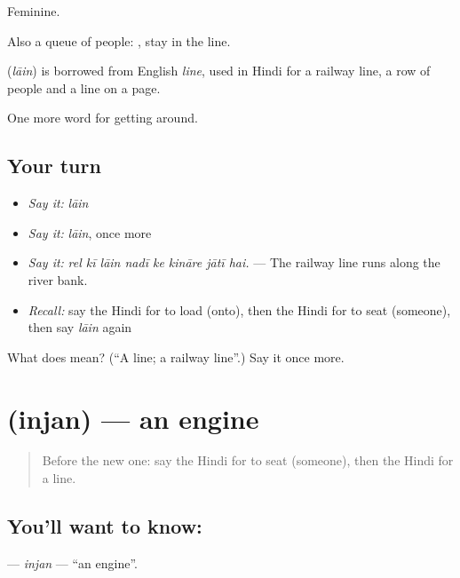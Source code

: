 Feminine.

Also a queue of people:    , stay in the line.

\begin{cousinweb}
\textbf{} (\emph{lāin}) is borrowed from English \emph{line}, used in Hindi for a railway line, a row of people and a line on a page.
\end{cousinweb}

\begin{grammarlens}[title={What you've built}]
One more word for getting around.
\end{grammarlens}

\subsection*{Your turn}
\begin{itemize}
\raggedright
  \item \emph{Say it:} \emph{lāin}
  \item \emph{Say it:} \emph{lāin}, once more
  \item \emph{Say it:} \emph{rel kī lāin nadī ke kināre jātī hai.} — The railway line runs along the river bank.
  \item \emph{Recall:} say the Hindi for to load (onto), then the Hindi for to seat (someone), then say \emph{lāin} again
\end{itemize}

\begin{tcolorbox}[breakable,colback=teal!4,colframe=teal!35!black,title={Before you move on}]
What does  mean? (\textquotedblleft{}A line; a railway line\textquotedblright{}.) Say it once more.
\end{tcolorbox}
\section[\texorpdfstring{\hi{इंजन} (injan)}{इंजन (injan)}]{ (injan) — an engine}

\label{lesson:HI-C399-injan}



\begin{quote}
Before the new one: say the Hindi for to seat (someone), then the Hindi for a line.
\end{quote}

\subsection*{You'll want to know: }
\textbf{} — \emph{injan} — \textquotedblleft{}an engine\textquotedblright{}.

